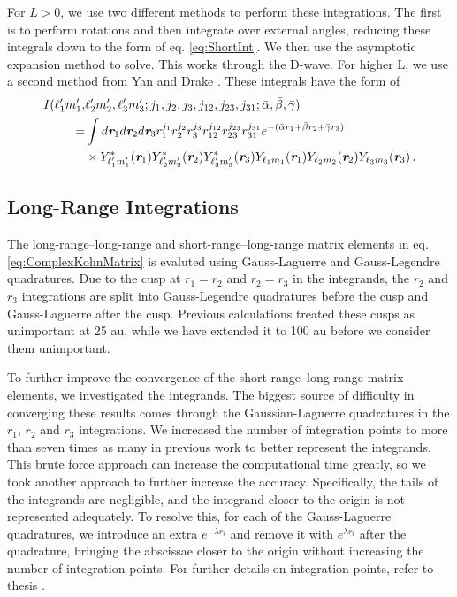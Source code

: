 \documentclass[preprint,showpacs,preprintnumbers,amsmath,amssymb]{revtex4}
\newcommand{\todoi}{\todo[inline]}
\begin{document}
For $L > 0$, we use two different methods to perform these integrations. The first is to perform rotations and then integrate over external angles, reducing these integrals down to the form of eq. \ref{eq:ShortInt}. We then use the asymptotic expansion method to solve. This works through the D-wave. For higher L, we use a second method from Yan and Drake \cite{Yan1997}. These integrals have the form of
\begin{align}
\label{eq:ShortIntGen}
\nonumber I(\ell_1^\prime m_1^\prime, & \ell_2^\prime m_2^\prime, \ell_3^\prime m_3^\prime; j_1,j_2,j_3,j_{12},j_{23},j_{31}; \bar{\alpha}, \bar{\beta}, \bar{\gamma}) \\
\nonumber = & \int
d \textit{\textbf{r}}_1 d \textit{\textbf{r}}_2 d \textit{\textbf{r}}_3
r_1^{j_1} r_2^{j_2} r_3^{j_3} r_{12}^{j_{12}}
r_{23}^{j_{23}} r_{31}^{j_{31}}
e^{-(\bar{\alpha} r_1 + \bar{\beta} r_2 + \bar{\gamma} r_3)} \\
& \times Y_{\ell_1^\prime m_1^\prime}^* (\textit{\textbf{r}}_1) Y_{\ell_2^\prime m_2^\prime}^* (\textit{\textbf{r}}_2) Y_{\ell_3^\prime m_3^\prime}^* (\textit{\textbf{r}}_3)
Y_{\ell_1 m_1} (\textit{\textbf{r}}_1) Y_{\ell_2 m_2} (\textit{\textbf{r}}_2) Y_{\ell_3 m_3} (\textit{\textbf{r}}_3)\, .
\end{align}

\subsection{Long-Range Integrations}
\label{sec:LongInt}
The long-range--long-range and short-range--long-range matrix elements in eq. \ref{eq:ComplexKohnMatrix} is evaluted using Gauss-Laguerre and Gauss-Legendre quadratures. Due to the cusp at $r_1 = r_2$ and $r_2 = r_3$ in the integrands, the $r_2$ and $r_3$ integrations are split into Gauss-Legendre quadratures before the cusp and Gauss-Laguerre after the cusp. Previous calculations \cite{VanReeth2003,VanReeth2004} treated these cusps as unimportant at 25 au, while we have extended it to 100 au before we consider them unimportant.

To further improve the convergence of the short-range--long-range matrix elements, we investigated the integrands. The biggest source of difficulty in converging these results comes through the Gaussian-Laguerre quadratures in the $r_1$, $r_2$ and $r_3$ integrations. We increased the number of integration points to more than seven times as many in previous work \cite{VanReeth2003,VanReeth2004} to better represent the integrands. This brute force approach can increase the computational time greatly, so we took another approach to further increase the accuracy. Specifically, the tails of the integrands are negligible, and the integrand closer to the origin is not represented adequately. To resolve this, for each of the Gauss-Laguerre quadratures, we introduce an extra $e^{-\lambda r_i}$ and remove it with $e^{\lambda r_i}$ after the quadrature, bringing the abscissae closer to the origin without increasing the number of integration points. For further details on integration points, refer to thesis \cite{Woods2015}.
\end{document}
